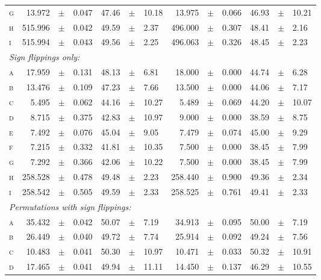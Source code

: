 \begin{table}[!tp]
\begin{center}
{\begin{tabular}{@{}lr@{\hspace{3pt}}c@{\hspace{3pt}}lr@{\hspace{3pt}}c@{\hspace{3pt}}lr@{\hspace{3pt}}c@{\hspace{3pt}}lr@{\hspace{3pt}}c@{\hspace{3pt}}l@{}}
\textsc{g} & 13.972 & $\pm$ & 0.047 & 47.46 & $\pm$ & 10.18 & 13.975 & $\pm$ & 0.066 & 46.93 & $\pm$ & 10.21 \\
\textsc{h} & 515.996 & $\pm$ & 0.042 & 49.59 & $\pm$ & 2.37 & 496.000 & $\pm$ & 0.307 & 48.41 & $\pm$ & 2.16 \\
\textsc{i} & 515.994 & $\pm$ & 0.043 & 49.56 & $\pm$ & 2.25 & 496.063 & $\pm$ & 0.326 & 48.45 & $\pm$ & 2.23 \\
\midrule
\multicolumn{13}{l}{\emph{Sign flippings only:}}\\
\textsc{a} & 17.959 & $\pm$ & 0.131 & 48.13 & $\pm$ & 6.81 & 18.000 & $\pm$ & 0.000 & 44.74 & $\pm$ & 6.28\\
\textsc{b} & 13.476 & $\pm$ & 0.109 & 47.23 & $\pm$ & 7.66 & 13.500 & $\pm$ & 0.000 & 44.06 & $\pm$ & 7.17\\
\textsc{c} & 5.495 & $\pm$ & 0.062 & 44.16 & $\pm$ & 10.27 & 5.489 & $\pm$ & 0.069 & 44.20 & $\pm$ & 10.07\\
\textsc{d} & 8.715 & $\pm$ & 0.375 & 42.83 & $\pm$ & 10.97 & 9.000 & $\pm$ & 0.000 & 38.59 & $\pm$ & 8.75\\
\textsc{e} & 7.492 & $\pm$ & 0.076 & 45.04 & $\pm$ & 9.05 & 7.479 & $\pm$ & 0.074 & 45.00 & $\pm$ & 9.29\\
\textsc{f} & 7.215 & $\pm$ & 0.332 & 41.81 & $\pm$ & 10.35 & 7.500 & $\pm$ & 0.000 & 38.45 & $\pm$ & 7.99\\
\textsc{g} & 7.292 & $\pm$ & 0.366 & 42.06 & $\pm$ & 10.22 & 7.500 & $\pm$ & 0.000 & 38.45 & $\pm$ & 7.99\\
\textsc{h} & 258.528 & $\pm$ & 0.478 & 49.48 & $\pm$ & 2.23 & 258.440 & $\pm$ & 0.900 & 49.36 & $\pm$ & 2.34\\
\textsc{i} & 258.542 & $\pm$ & 0.505 & 49.59 & $\pm$ & 2.33 & 258.525 & $\pm$ & 0.761 & 49.41 & $\pm$ & 2.33\\
\midrule
\multicolumn{13}{l}{\emph{Permutations with sign flippings:}}\\
\textsc{a} & 35.432 & $\pm$ & 0.042 & 50.07 & $\pm$ & 7.19 & 34.913 & $\pm$ & 0.095 & 50.00 & $\pm$ & 7.19\\
\textsc{b} & 26.449 & $\pm$ & 0.040 & 49.72 & $\pm$ & 7.74 & 25.914 & $\pm$ & 0.092 & 49.24 & $\pm$ & 7.56\\
\textsc{c} & 10.483 & $\pm$ & 0.041 & 50.30 & $\pm$ & 10.97 & 10.471 & $\pm$ & 0.033 & 50.32 & $\pm$ & 10.91\\
\textsc{d} & 17.465 & $\pm$ & 0.041 & 49.94 & $\pm$ & 11.11 & 14.450 & $\pm$ & 0.137 & 46.29 & $\pm$ & 10.55\\

\end{tabular}}
\end{center}
\end{table}
